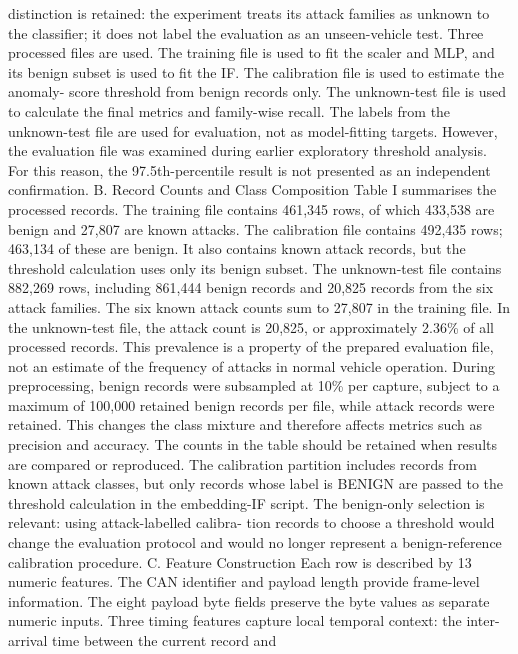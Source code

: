 \documentclass[
]{article}
\begin{document}
distinction is retained: the experiment treats its attack families as
unknown to the classifier; it does not label the evaluation as an
unseen-vehicle test. Three processed files are used. The training file
is used to fit the scaler and MLP, and its benign subset is used to fit
the IF. The calibration file is used to estimate the anomaly- score
threshold from benign records only. The unknown-test file is used to
calculate the final metrics and family-wise recall. The labels from the
unknown-test file are used for evaluation, not as model-fitting targets.
However, the evaluation file was examined during earlier exploratory
threshold analysis. For this reason, the 97.5th-percentile result is not
presented as an independent confirmation. B. Record Counts and Class
Composition Table I summarises the processed records. The training file
contains 461,345 rows, of which 433,538 are benign and 27,807 are known
attacks. The calibration file contains 492,435 rows; 463,134 of these
are benign. It also contains known attack records, but the threshold
calculation uses only its benign subset. The unknown-test file contains
882,269 rows, including 861,444 benign records and 20,825 records from
the six attack families. The six known attack counts sum to 27,807 in
the training file. In the unknown-test file, the attack count is 20,825,
or approximately 2.36\% of all processed records. This prevalence is a
property of the prepared evaluation file, not an estimate of the
frequency of attacks in normal vehicle operation. During preprocessing,
benign records were subsampled at 10\% per capture, subject to a maximum
of 100,000 retained benign records per file, while attack records were
retained. This changes the class mixture and therefore affects metrics
such as precision and accuracy. The counts in the table should be
retained when results are compared or reproduced. The calibration
partition includes records from known attack classes, but only records
whose label is BENIGN are passed to the threshold calculation in the
embedding-IF script. The benign-only selection is relevant: using
attack-labelled calibra- tion records to choose a threshold would change
the evaluation protocol and would no longer represent a benign-reference
calibration procedure. C. Feature Construction Each row is described by
13 numeric features. The CAN identifier and payload length provide
frame-level information. The eight payload byte fields preserve the byte
values as separate numeric inputs. Three timing features capture local
temporal context: the inter-arrival time between the current record and
\end{document}
